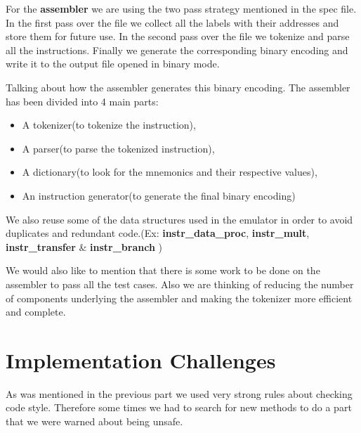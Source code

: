 \documentclass[11pt]{article}
\begin{document}
For the \textbf{assembler} we are using the two pass strategy mentioned in the spec
file. In the first pass over the file we collect all the labels with their
addresses and store them for future use. In the second pass over the file
we tokenize and parse all the instructions. Finally we generate the
corresponding binary encoding and write it to the output file opened in
binary mode.

Talking about how the assembler generates this binary encoding. The assembler
has been divided into 4 main parts:
\begin{itemize}[noitemsep,topsep=0pt]
\item A tokenizer(to tokenize the instruction),
\item A parser(to parse the tokenized instruction),
\item A dictionary(to look for the mnemonics and their respective values),
\item An instruction generator(to generate the final binary encoding)
\end{itemize}

We also reuse some of the data structures used in the emulator in order to
avoid duplicates and redundant code.(Ex:
\textbf{instr\_data\_proc}, \textbf{instr\_mult}, \textbf{instr\_transfer} \& \textbf{instr\_branch}
)

We would also like to mention that there is some work to be done on the
assembler to pass all the test cases. Also we are thinking of reducing the
number of components underlying the assembler and making the tokenizer more
efficient and complete.

\section{Implementation Challenges}

As was mentioned in the previous part we used very strong rules about checking
code style. Therefore some times we had to search for new methods to do a part
that we were warned about being unsafe.
\end{document}
